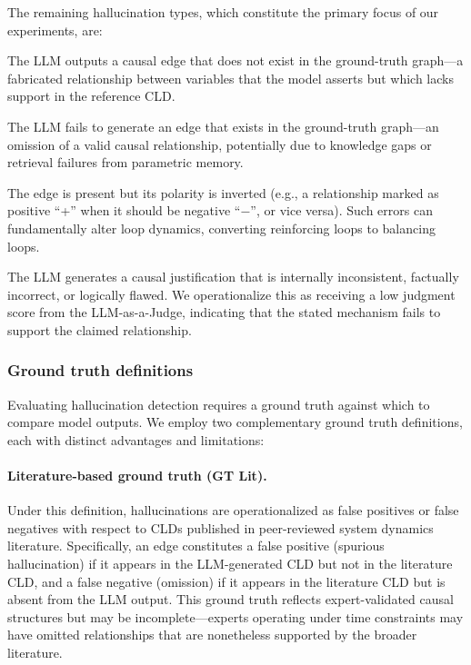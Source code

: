 The remaining hallucination types, which constitute the primary focus of our experiments, are:

\begin{description}[leftmargin=1.5em, labelindent=0em]
    \item[Spurious edge (false positive):] The LLM outputs a causal edge that does not exist in the ground-truth graph---a fabricated relationship between variables that the model asserts but which lacks support in the reference CLD.
    \item[Missing edge (false negative):] The LLM fails to generate an edge that exists in the ground-truth graph---an omission of a valid causal relationship, potentially due to knowledge gaps or retrieval failures from parametric memory.
    \item[Polarity error (wrong sign):] The edge is present but its polarity is inverted (e.g., a relationship marked as positive ``+'' when it should be negative ``$-$'', or vice versa). Such errors can fundamentally alter loop dynamics, converting reinforcing loops to balancing loops.
    \item[Wrong causal narrative:] The LLM generates a causal justification that is internally inconsistent, factually incorrect, or logically flawed. We operationalize this as receiving a low judgment score from the LLM-as-a-Judge, indicating that the stated mechanism fails to support the claimed relationship.
\end{description}

\subsubsection{Ground truth definitions}

Evaluating hallucination detection requires a ground truth against which to compare model outputs. We employ two complementary ground truth definitions, each with distinct advantages and limitations:

\paragraph{Literature-based ground truth (GT Lit).} Under this definition, hallucinations are operationalized as false positives or false negatives with respect to CLDs published in peer-reviewed system dynamics literature. Specifically, an edge constitutes a false positive (spurious hallucination) if it appears in the LLM-generated CLD but not in the literature CLD, and a false negative (omission) if it appears in the literature CLD but is absent from the LLM output. This ground truth reflects expert-validated causal structures but may be incomplete---experts operating under time constraints may have omitted relationships that are nonetheless supported by the broader literature.

